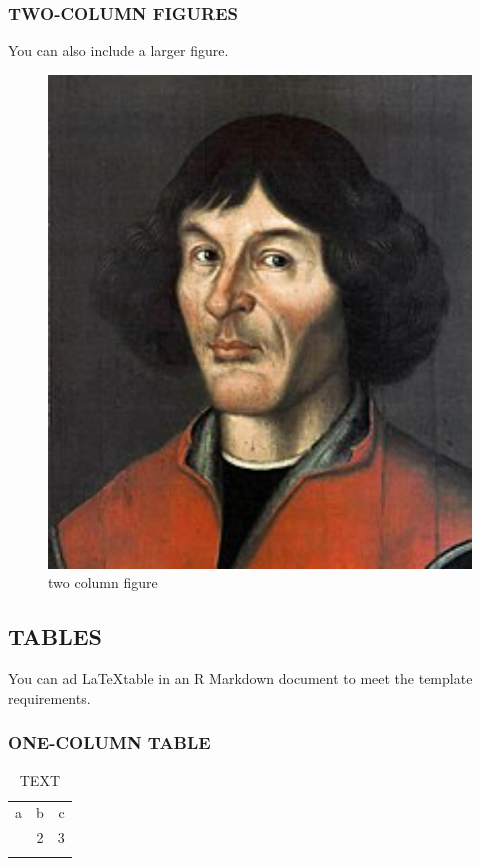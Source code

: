 \documentclass[gc, manuscript]{copernicus}
\begin{document}
\subsubsection{TWO-COLUMN FIGURES}

You can also include a larger figure.

\begin{figure}
\includegraphics[width=12cm]{Nikolaus_Kopernikus} \caption{two column figure}\label{fig:unnamed-chunk-12}
\end{figure}

\subsection{TABLES}

You can ad \LaTeX table in an R Markdown document to meet the template
requirements.

\subsubsection{ONE-COLUMN TABLE}

\begin{table}[t]
\caption{TEXT}
\begin{tabular}{l c r}
\tophline

a & b & c \\
\middlehline
1 & 2 & 3 \\

\bottomhline
\end{tabular}
\end{table}
\end{document}
